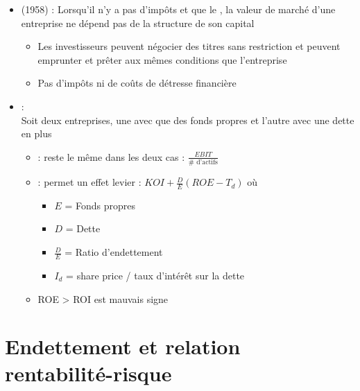 \begin{itemize}
    \item {} (1958) : Lorsqu'il n'y a pas d'impôts et que le , la valeur de marché d'une entreprise ne dépend pas de la structure de son capital
    \begin{itemize}
        \item[\textgreen{$\rightarrow$}] Les investisseurs peuvent négocier des titres sans restriction et peuvent emprunter et prêter aux mêmes conditions que l'entreprise
        \item[\textgreen{$\rightarrow$}] Pas d'impôts ni de coûts de détresse financière
    \end{itemize}
    \item {} :\\
    Soit deux entreprises, une avec que des fonds propres et l'autre avec une dette en plus
    \begin{itemize}
        \item {} : reste le même dans les deux cas : $\frac{EBIT}{\# \text{ d'actifs}}$
        \item {} : permet un effet levier : $KOI + \frac{D}{E} (ROE - T_d)$ où
        \begin{itemize}
            \item $E$ = Fonds propres
            \item $D$ = Dette
            \item $\frac{D}{E}$ = Ratio d'endettement
            \item $I_d$ = share price / taux d'intérêt sur la dette
        \end{itemize}
        \item ROE > ROI est mauvais signe
    \end{itemize}
\end{itemize}

\section{Endettement et relation rentabilité-risque}

